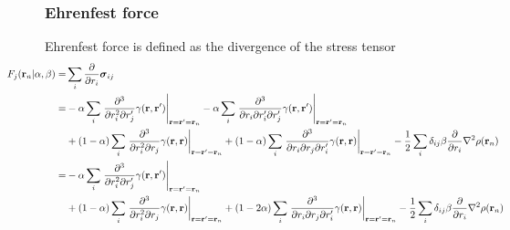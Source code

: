 \documentclass[letterpaper]{article}
\begin{document}
\subsubsection{Ehrenfest force}
Ehrenfest force is defined as the divergence of the stress tensor
\begin{equation}
  \hspace{-4em}
  \begin{split}
    F_{j}(\mathbf{r}_n | \alpha, \beta)
    =&
    \sum_i \frac{\partial}{\partial r_i} \boldsymbol{\sigma}_{ij}\\
    =&
    - \alpha
    \sum_i
    \left.
      \frac{\partial^3}{\partial r^2_i \partial r'_j} \gamma(\mathbf{r}, \mathbf{r}')
    \right|_{\mathbf{r} = \mathbf{r}' = \mathbf{r}_n}
    - \alpha
    \sum_i
    \left.
      \frac{\partial^3}{\partial r_i \partial r'_i \partial r'_j} \gamma(\mathbf{r}, \mathbf{r}')
    \right|_{\mathbf{r} = \mathbf{r}' = \mathbf{r}_n}\\
    &+ (1 - \alpha)
    \sum_i
    \left.
      \frac{\partial^3}{\partial r^2_i \partial r_j} \gamma(\mathbf{r}, \mathbf{r})
    \right|_{\mathbf{r} = \mathbf{r}' = \mathbf{r}_n}
    + (1 - \alpha)
    \sum_i
    \left.
      \frac{\partial^3}{\partial r_i \partial r_j \partial r'_i} \gamma(\mathbf{r}, \mathbf{r})
    \right|_{\mathbf{r} = \mathbf{r}' = \mathbf{r}_n}
    - \frac{1}{2} \sum_i \delta_{ij} \beta
    \frac{\partial}{\partial r_i} \nabla^2 \rho(\mathbf{r}_n)\\
    =&
    - \alpha
    \sum_i
    \left.
      \frac{\partial^3}{\partial r^2_i \partial r'_j} \gamma(\mathbf{r}, \mathbf{r}')
    \right|_{\mathbf{r} = \mathbf{r}' = \mathbf{r}_n}\\
    &+ (1 - \alpha)
    \sum_i
    \left.
      \frac{\partial^3}{\partial r^2_i \partial r_j} \gamma(\mathbf{r}, \mathbf{r})
    \right|_{\mathbf{r} = \mathbf{r}' = \mathbf{r}_n}
    + (1 - 2\alpha)
    \sum_i
    \left.
      \frac{\partial^3}{\partial r_i \partial r_j \partial r'_i} \gamma(\mathbf{r}, \mathbf{r})
    \right|_{\mathbf{r} = \mathbf{r}' = \mathbf{r}_n}
    - \frac{1}{2} \sum_i \delta_{ij} \beta
    \frac{\partial}{\partial r_i} \nabla^2 \rho(\mathbf{r}_n)\\
  \end{split}
\end{equation}
\end{document}

